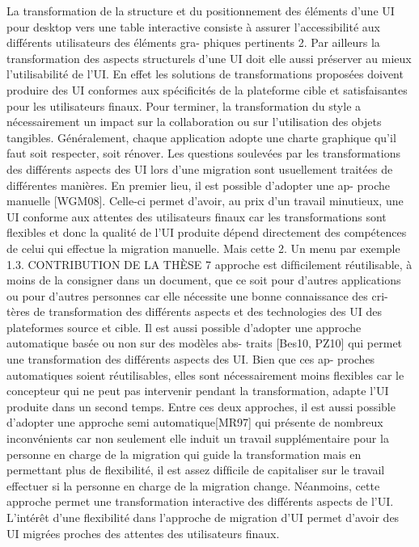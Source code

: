 \documentclass{article}
\begin{document}
La transformation de la structure et du positionnement des éléments d’une UI pour desktop vers
une table interactive consiste à assurer l’accessibilité aux différents utilisateurs des éléments gra-
phiques pertinents 2. Par ailleurs la transformation des aspects structurels d’une UI doit elle aussi
préserver au mieux l’utilisabilité de l’UI. En effet les solutions de transformations proposées doivent
produire des UI conformes aux spéciﬁcités de la plateforme cible et satisfaisantes pour les utilisateurs
ﬁnaux.
Pour terminer, la transformation du style a nécessairement un impact sur la collaboration ou sur
l’utilisation des objets tangibles. Généralement, chaque application adopte une charte graphique qu’il
faut soit respecter, soit rénover.
Les questions soulevées par les transformations des différents aspects des UI lors d’une migration
sont usuellement traitées de différentes manières. En premier lieu, il est possible d’adopter une ap-
proche manuelle [WGM08]. Celle-ci permet d’avoir, au prix d’un travail minutieux, une UI conforme
aux attentes des utilisateurs ﬁnaux car les transformations sont ﬂexibles et donc la qualité de l’UI
produite dépend directement des compétences de celui qui effectue la migration manuelle. Mais cette
2. Un menu par exemple
1.3. CONTRIBUTION DE LA THÈSE
7
approche est difﬁcilement réutilisable, à moins de la consigner dans un document, que ce soit pour
d’autres applications ou pour d’autres personnes car elle nécessite une bonne connaissance des cri-
tères de transformation des différents aspects et des technologies des UI des plateformes source et
cible.
Il est aussi possible d’adopter une approche automatique basée ou non sur des modèles abs-
traits [Bes10, PZ10] qui permet une transformation des différents aspects des UI. Bien que ces ap-
proches automatiques soient réutilisables, elles sont nécessairement moins ﬂexibles car le concepteur
qui ne peut pas intervenir pendant la transformation, adapte l’UI produite dans un second temps.
Entre ces deux approches, il est aussi possible d’adopter une approche semi automatique[MR97]
qui présente de nombreux inconvénients car non seulement elle induit un travail supplémentaire pour
la personne en charge de la migration qui guide la transformation mais en permettant plus de ﬂexibilité,
il est assez difﬁcile de capitaliser sur le travail effectuer si la personne en charge de la migration
change. Néanmoins, cette approche permet une transformation interactive des différents aspects de
l’UI. L’intérêt d’une ﬂexibilité dans l’approche de migration d’UI permet d’avoir des UI migrées
proches des attentes des utilisateurs ﬁnaux.
\end{document}
